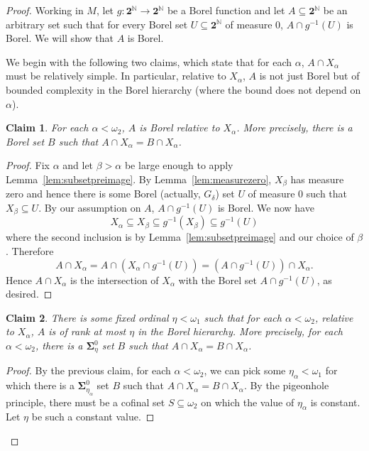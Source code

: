 \documentclass[11pt]{amsart}
\newcommand\I{^{-1}}
\newcommand{\N}{\mathbb{N}}
\newcommand\two{\mathbf{2}}
\newcommand\Cantor{\two^\N}
\theoremstyle{definition}
\theoremstyle{remark}
\theoremstyle{plain}
\newtheorem*{claim}{Claim}
\begin{document}
\begin{proof}
Working in $M$, let $g\colon \Cantor \to \Cantor$ be a Borel function and let $A \subseteq \Cantor$ be an arbitrary set such that for every Borel set $U \subseteq \Cantor$ of measure $0$, $A \cap g\I(U)$ is Borel. We will show that $A$ is Borel.

We begin with the following two claims, which state that for each $\alpha$, $A \cap X_\alpha$ must be relatively simple. In particular, relative to $X_\alpha$, $A$ is not just Borel but of bounded complexity in the Borel hierarchy (where the bound does not depend on $\alpha$).

\begin{claim}
For each $\alpha < \omega_2$, $A$ is Borel relative to $X_\alpha$. More precisely, there is a Borel set $B$ such that $A\cap X_\alpha = B\cap X_\alpha$.
\end{claim}

\begin{proof}
Fix $\alpha$ and let $\beta > \alpha$ be large enough to apply Lemma~\ref{lem:subsetpreimage}. By Lemma~\ref{lem:measurezero}, $X_\beta$ has measure zero and hence there is some Borel (actually, $G_\delta$) set $U$ of measure $0$ such that $X_\beta \subseteq U$. By our assumption on $A$, $A\cap g\I(U)$ is Borel. We now have
\[
    X_\alpha \subseteq X_\beta \subseteq g\I(X_\beta) \subseteq g\I(U)
\]
where the second inclusion is by Lemma~\ref{lem:subsetpreimage} and our choice of $\beta$. Therefore
\[
    A\cap X_\alpha = A\cap (X_\alpha \cap g\I(U)) =(A \cap g\I(U)) \cap X_\alpha.
\]
Hence $A \cap X_\alpha$ is the intersection of $X_\alpha$ with the Borel set $A\cap g\I(U)$, as desired.
\end{proof}

\begin{claim}
There is some fixed ordinal $\eta < \omega_1$ such that for each $\alpha < \omega_2$, relative to $X_\alpha$, $A$ is of rank at most $\eta$ in the Borel hierarchy. More precisely, for each $\alpha < \omega_2$, there is a $\mathbf{\Sigma}^0_\eta$ set $B$ such that $A\cap X_\alpha = B\cap X_\alpha$.
\end{claim}

\begin{proof}
By the previous claim, for each $\alpha < \omega_2$, we can pick some $\eta_\alpha < \omega_1$ for which there is a $\mathbf{\Sigma}^0_{\eta_\alpha}$ set $B$ such that $A\cap X_\alpha = B\cap X_\alpha$. By the pigeonhole principle, there must be a cofinal set $S\subseteq \omega_2$ on which the value of $\eta_\alpha$ is constant. Let $\eta$ be such a constant value.


\end{proof}
\end{proof}
\end{document}
